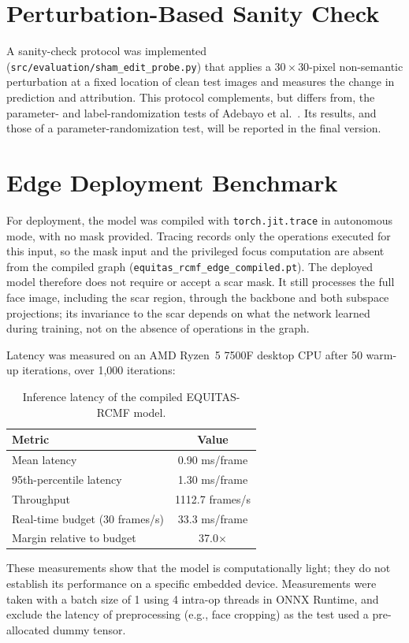 \section{Perturbation-Based Sanity Check}
A sanity-check protocol was implemented (\texttt{src/evaluation/sham\_edit\_probe.py}) that applies a $30 \times 30$-pixel non-semantic perturbation at a fixed location of clean test images and measures the change in prediction and attribution. This protocol complements, but differs from, the parameter- and label-randomization tests of Adebayo et al.~\cite{adebayo2018}. Its results, and those of a parameter-randomization test, will be reported in the final version.

\section{Edge Deployment Benchmark}
\label{sec:deployment}
For deployment, the model was compiled with \texttt{torch.jit.trace} in autonomous mode, with no mask provided. Tracing records only the operations executed for this input, so the mask input and the privileged focus computation are absent from the compiled graph (\texttt{equitas\_rcmf\_edge\_compiled.pt}). The deployed model therefore does not require or accept a scar mask. It still processes the full face image, including the scar region, through the backbone and both subspace projections; its invariance to the scar depends on what the network learned during training, not on the absence of operations in the graph.

Latency was measured on an AMD Ryzen~5 7500F desktop CPU after 50 warm-up iterations, over 1,000 iterations:
\begin{table}[htbp]
\centering
\begin{tabular}{@{}lc@{}}
\toprule
\textbf{Metric} & \textbf{Value} \\
\midrule
Mean latency & 0.90 ms/frame \\
95th-percentile latency & 1.30 ms/frame \\
Throughput & 1112.7 frames/s \\
Real-time budget (30 frames/s) & 33.3 ms/frame \\
Margin relative to budget & 37.0$\times$ \\
\bottomrule
\end{tabular}
\caption{Inference latency of the compiled EQUITAS-RCMF model.}
\label{tab:latency}
\end{table}
These measurements show that the model is computationally light; they do not establish its performance on a specific embedded device.
Measurements were taken with a batch size of 1 using 4 intra-op threads in ONNX Runtime, and exclude the latency of preprocessing (e.g., face cropping) as the test used a pre-allocated dummy tensor.

